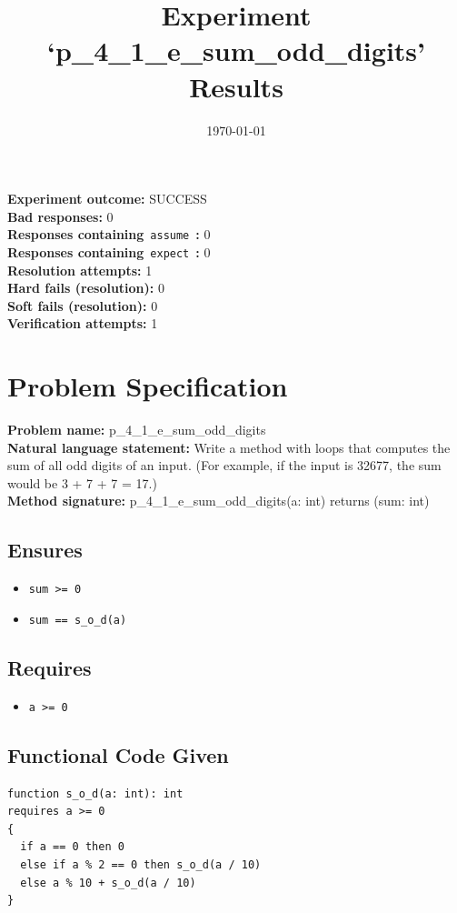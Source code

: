 \documentclass{article}
\begin{document}
\title{Experiment `p\_4\_1\_e\_sum\_odd\_digits' Results}
\author{\today}
\date{}
\maketitle
\textbf{Experiment outcome: }SUCCESS
\\\textbf{Bad responses: }0
\\\textbf{Responses containing}~\texttt{assume}~\textbf{: }0
\\\textbf{Responses containing}~\texttt{expect}~\textbf{: }0
\\\textbf{Resolution attempts: }1
\\\textbf{Hard fails (resolution): }0
\\\textbf{Soft fails (resolution): }0
\\\textbf{Verification attempts: }1
\section*{Problem Specification}
\textbf{Problem name: }p\_4\_1\_e\_sum\_odd\_digits
\\\textbf{Natural language statement: }Write a method with loops that computes the sum of all odd digits of an input. (For example, if the input is 32677, the sum would be 3 + 7 + 7 = 17.)
\\\textbf{Method signature: }p\_4\_1\_e\_sum\_odd\_digits(a: int) returns (sum: int)
\subsection*{Ensures}
\begin{itemize}
\item \texttt{sum >= 0}
\item \texttt{sum == s\_o\_d(a)}
\end{itemize}
\subsection*{Requires}
\begin{itemize}
\item \texttt{a >= 0}
\end{itemize}
\subsection*{Functional Code Given}
\begin{lstlisting}
function s_o_d(a: int): int
requires a >= 0
{
  if a == 0 then 0
  else if a % 2 == 0 then s_o_d(a / 10)
  else a % 10 + s_o_d(a / 10)
}
\end{lstlisting}
\clearpage
\end{document}
